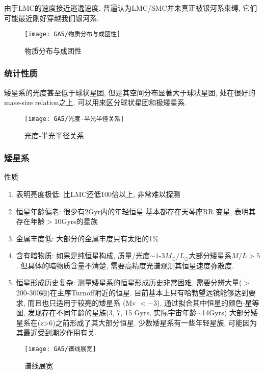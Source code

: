 由于LMC的速度接近逃逸速度, 普遍认为LMC/SMC并未真正被银河系束缚, 它们可能最近刚好穿越我们银河系. 

\begin{figure}[!htb]
    \centering
    \texttt{[image: GA5/物质分布与成团性]}
    \caption{物质分布与成团性}
\end{figure}

\subsubsection{统计性质}

矮星系的光度甚至低于球状星团, 但是其空间分布显著大于球状星团, 处在很好的mass-size relation之上, 可以用来区分球状星团和极矮星系. 

\begin{figure}[!htb]
    \centering
    \texttt{[image: GA5/光度-半光半径关系]}
    \caption{光度-半光半径关系}
\end{figure}

\subsubsection{矮星系}
性质
\begin{enumerate}\small
    \item 表明亮度极低: 比LMC还低100倍以上, 非常难以探测
    \item 恒星年龄偏老: 很少有2Gyr内的年轻恒星 基本都存在天琴座RR 变星, 表明其存在年龄$>$10Gyrs的星族
    \item 金属丰度低: 大部分的金属丰度只有太阳的1\%
    \item 含有暗物质: 如果是纯恒星构成, 质量/光度$\sim 1$-$3 M_{\odot}/L_{\odot}$大部分矮星系$M/L>5$.  但具体的暗物质含量不清楚, 需要高精度光谱观测其恒星速度弥散度. 
    \item 恒星形成历史复杂: 测量矮星系的恒星形成历史非常困难, 需要分辨大量($>$200-300颗)在主序Turnoff附近的恒星. 目前基本上只有哈勃望远镜能够达到要求, 而且也只适用于较亮的矮星系 (Mv $<-3$). 
    \subitem 通过拟合其中恒星的颜色-星等图, 发现存在不同年龄的星族(3, 7, 15 Gyrs, 实际宇宙年龄$\sim $14Gyrs)
    \subitem  大部分矮星系在(z>6)之前形成了其大部分恒星. 少数矮星系有一些年轻星族, 可能因为其最近受到潮汐作用有关. 
\end{enumerate}

\begin{figure}[!htb]
    \centering
    \texttt{[image: GA5/谱线展宽]}
    \caption{谱线展宽}
\end{figure}

